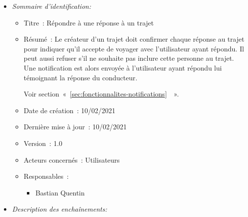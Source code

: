 \begin{itemize}

\item \textit{Sommaire d'identification:}

\begin{itemize}

\item Titre~: Répondre à une réponse à un trajet

\item Résumé~: Le créateur d'un trajet doit confirmer chaque réponse au trajet pour indiquer qu'il accepte de voyager avec l'utilisateur ayant répondu. Il peut aussi refuser s'il ne souhaite pas inclure cette personne au trajet.
Une notification est alors envoyée à l'utilisateur ayant répondu lui témoignant la réponse du conducteur.

Voir section~«~\ref{sec:fonctionnalites-notifications}~~».

\item Date de création~: 10/02/2021

\item Dernière mise à jour~: 10/02/2021

\item Version~: 1.0

\item Acteurs concernés~: Utilisateurs

\item Responsables~:
\begin{itemize}
            \item Bastian Quentin
        \end{itemize}

\end{itemize}

\item \textit{Description des enchaînements:}


\end{itemize}
